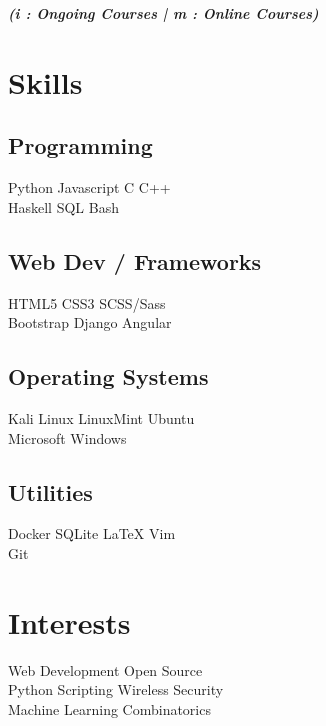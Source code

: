 \documentclass[]{deedy-resume-openfont}
\begin{document}
\begin{minipage}[t]{0.33\textwidth}
{\footnotesize \textit{\textbf{ (i : Ongoing Courses | m : Online Courses)}}}


\section{Skills}
\subsection{Programming}
Python \textbullet{} Javascript \textbullet{} C \textbullet{} C++ \\  
 \vspace{0.1 cm}
Haskell \textbullet{} SQL \textbullet{} Bash \\
\vspace{0.3 cm} 
\subsection{Web Dev / Frameworks}
HTML5 \textbullet{} CSS3 \textbullet{}  SCSS/Sass \\ 
Bootstrap \textbullet{} Django \textbullet{} Angular \\
\vspace{0.3 cm}
\subsection{Operating Systems}
Kali Linux \textbullet{} LinuxMint \textbullet{} Ubuntu \\
Microsoft Windows
\vspace{0.3 cm}
\subsection{Utilities}
Docker \textbullet{} SQLite \textbullet{} \LaTeX{} \textbullet{} Vim \\
Git  \\


\section{Interests}
Web Development \textbullet{}Open Source \\
Python Scripting \textbullet{} Wireless Security \\
Machine Learning  \textbullet{} Combinatorics\\
%
%

\end{minipage} 
\end{document}
